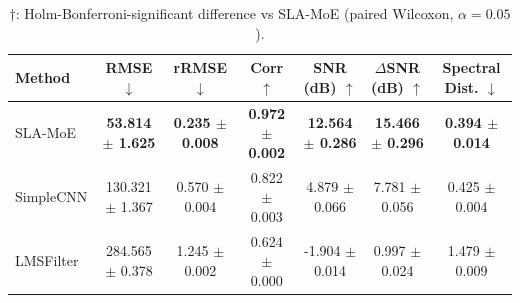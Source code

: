 \begin{table}[htbp]
\centering
\caption{Performance comparison on EEG_EOG_EMG at input SNR = -3.0 dB. Mean $\pm$ std over 2 seeds and 2 subject-grouped folds. Best in \textbf{bold}.}
\label{tab:overall_results_eeg_eog_emg}
\begin{tabular}{lcccccc}
\toprule
Method & RMSE $\downarrow$ & rRMSE $\downarrow$ & Corr $\uparrow$ & SNR (dB) $\uparrow$ & $\Delta$SNR (dB) $\uparrow$ & Spectral Dist. $\downarrow$ \\
\midrule
SLA-MoE & \textbf{53.814 $\pm$ 1.625} & \textbf{0.235 $\pm$ 0.008} & \textbf{0.972 $\pm$ 0.002} & \textbf{12.564 $\pm$ 0.286} & \textbf{15.466 $\pm$ 0.296} & \textbf{0.394 $\pm$ 0.014} \\
SimpleCNN & 130.321 $\pm$ 1.367 & 0.570 $\pm$ 0.004 & 0.822 $\pm$ 0.003 & 4.879 $\pm$ 0.066 & 7.781 $\pm$ 0.056 & 0.425 $\pm$ 0.004 \\
LMSFilter & 284.565 $\pm$ 0.378 & 1.245 $\pm$ 0.002 & 0.624 $\pm$ 0.000 & -1.904 $\pm$ 0.014 & 0.997 $\pm$ 0.024 & 1.479 $\pm$ 0.009 \\
\bottomrule
\end{tabular}
\caption*{$\dagger$: Holm-Bonferroni-significant difference vs SLA-MoE (paired Wilcoxon, $\alpha=0.05$).}
\end{table}